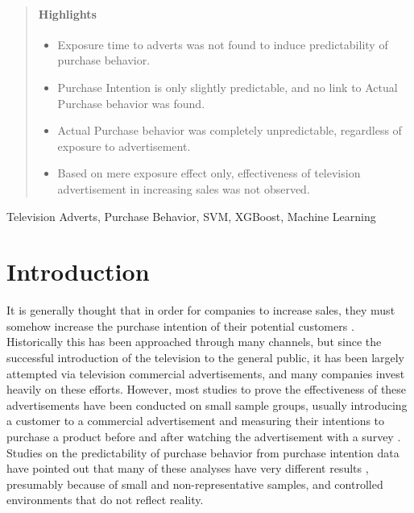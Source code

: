 \documentclass[review]{elsarticle}
\begin{document}
\begin{frontmatter}
\begin{abstract}
\paragraph{Highlights}
\begin{itemize}
\setlength\itemsep{-0.5em}
\item Exposure time to adverts was not found to induce predictability of purchase behavior.
\item Purchase Intention is only slightly predictable, and no link to Actual Purchase behavior was found.
\item Actual Purchase behavior was completely unpredictable, regardless of exposure to advertisement. 
\item Based on mere exposure effect only, effectiveness of television advertisement in increasing sales was not observed.
\end{itemize}

\end{abstract}

\begin{keyword}
Television Adverts\sep
Purchase Behavior\sep
SVM\sep
XGBoost\sep
Machine Learning
\end{keyword}

\end{frontmatter}

\linenumbers

\section{Introduction}
\label{intro}

It is generally thought that in order for companies to increase sales, they must somehow increase the purchase intention of their potential customers \cite{1,2}. Historically this has been approached through many channels, but since the successful introduction of the television to the general public, it has been largely attempted via television commercial advertisements, and many companies invest heavily on these efforts. However, most studies to prove the effectiveness of these advertisements have been conducted on small sample groups, usually introducing a customer to a commercial advertisement and measuring their intentions to purchase a product before and after watching the advertisement with a survey \cite[e.g.][]{3}. Studies on the predictability of purchase behavior from purchase intention data have pointed out that many of these analyses have very different results \cite{2,4,5}, presumably because of small and non-representative samples, and controlled environments that do not reflect reality. 
\end{document}
